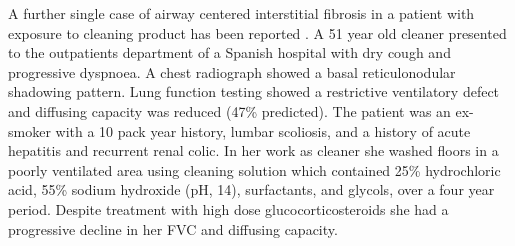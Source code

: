 \documentclass[a4
er,12pt]{article}
\begin{document}
A further single case of airway centered interstitial fibrosis in a patient with exposure to cleaning product has been reported \cite{Serrano2006}. A 51 year old cleaner presented to the outpatients department of a Spanish hospital with dry cough and progressive dyspnoea. A chest radiograph showed a basal reticulonodular shadowing pattern. Lung function testing showed a restrictive ventilatory defect and diffusing capacity was reduced (47\% predicted). The patient was an ex-smoker with a 10 pack year history, lumbar scoliosis, and a history of acute hepatitis and recurrent renal colic. In her work as cleaner she washed floors in a poorly ventilated area using cleaning solution which contained 25\% hydrochloric acid, 55\% sodium hydroxide (pH, 14), surfactants, and glycols, over a four year period. Despite treatment with high dose glucocorticosteroids she had a progressive decline in her FVC and diffusing capacity.
\end{document}
